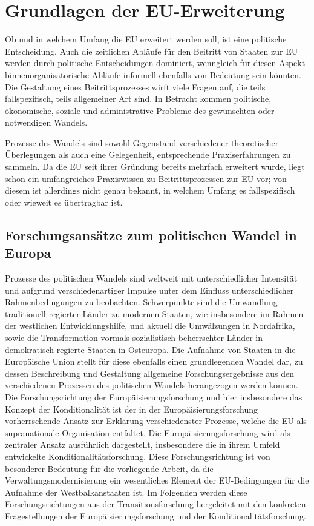 \chapter{Grundlagen der EU-Erweiterung }
Ob und in welchem Umfang die EU erweitert werden soll, ist eine politische Entscheidung. Auch die zeitlichen Abläufe für den Beitritt von Staaten zur EU werden durch politische Entscheidungen dominiert, wenngleich für diesen Aspekt binnenorganisatorische Abläufe informell ebenfalls von Bedeutung sein könnten. Die Gestaltung eines Beitrittsprozesses wirft viele Fragen auf, die teils fallspezifisch, teils allgemeiner Art sind. In Betracht kommen politische, ökonomische, soziale und administrative Probleme des gewünschten oder notwendigen Wandels. \par
Prozesse des Wandels sind sowohl Gegenstand verschiedener theoretischer Überlegungen als auch eine Gelegenheit, entsprechende Praxiserfahrungen zu sammeln. Da die EU seit ihrer Gründung bereits mehrfach erweitert wurde, liegt schon ein umfangreiches Praxiswissen zu Beitrittsprozessen zur EU vor; von diesem ist allerdings nicht genau bekannt, in welchem Umfang es fallspezifisch oder wieweit es übertragbar ist.
\section{Forschungsansätze zum politischen Wandel in Europa}
Prozesse des politischen Wandels sind weltweit mit unterschiedlicher Intensität und aufgrund verschiedenartiger Impulse unter dem Einfluss unterschiedlicher Rahmenbedingungen zu beobachten. Schwerpunkte sind die Umwandlung traditionell regierter Länder zu modernen Staaten, wie insbesondere im Rahmen der westlichen Entwicklungshilfe, und aktuell die Umwälzungen in Nordafrika, sowie die Transformation vormals sozialistisch beherrschter Länder in demokratisch regierte Staaten in Osteuropa. Die Aufnahme von Staaten in die Europäische Union stellt für diese ebenfalls einen grundlegenden Wandel dar, zu dessen Beschreibung und Gestaltung allgemeine Forschungsergebnisse aus den verschiedenen Prozessen des politischen Wandels herangezogen werden können. Die Forschungsrichtung der Europäisierungsforschung und hier insbesondere das Konzept der Konditionalität ist der in der Europäisierungsforschung vorherrschende Ansatz zur Erklärung verschiedenster Prozesse, welche die EU als supranationale Organisation entfaltet. Die Europäisierungsforschung wird als zentraler Ansatz ausführlich dargestellt, insbesondere die in ihrem Umfeld entwickelte Konditionalitätsforschung. Diese Forschungsrichtung ist von besonderer Bedeutung für die vorliegende Arbeit, da die Verwaltungsmodernisierung ein wesentliches Element der EU-Bedingungen für die Aufnahme der Westbalkanstaaten ist. Im Folgenden werden diese Forschungsrichtungen aus der Transitionsforschung hergeleitet mit den konkreten Fragestellungen der Europäisierungsforschung und der Konditionalitätsforschung. 
